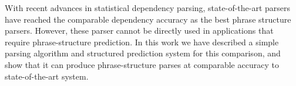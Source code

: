 \documentclass[11pt,letterpaper]{article}
\newcommand{\RuleA}[3]{#1 \rightarrow #2^*\ #3}
\newcommand{\RuleB}[3]{#1 \rightarrow #2\ #3^*}
\begin{document}
With recent advances in statistical dependency parsing, state-of-the-art parsers
have reached the comparable  dependency accuracy as the best phrase structure parsers. However,
these parser cannot be directly used in applications that require phrase-structure prediction. In this work
we have described a simple parsing algorithm and structured prediction system for this comparison, and show that it
can produce phrase-structure parses at comparable accuracy to state-of-the-art system.




















\end{document}
